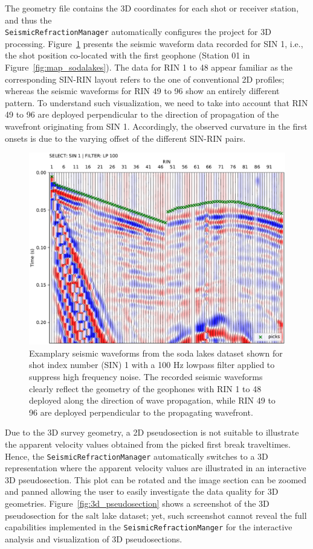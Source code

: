 \documentclass[a4paper,fleqn]{cas-sc}
\begin{document}
The geometry file contains the 3D coordinates for each shot or receiver station, and thus the\\ \texttt{SeismicRefractionManager} 
automatically configures the project for 3D processing. 
Figure~\ref{fig:3d_pickwindow} presents the seismic waveform data recorded for SIN 1, i.e., the shot position co-located with the first geophone (Station 01 in Figure~\ref{fig:map_sodalakes}). The data for RIN 1 to 48 appear familiar as the corresponding SIN-RIN layout refers to the one of conventional 2D profiles; whereas the seismic waveforms for RIN 49 to 96 show an entirely different pattern. To understand such visualization, we need to take into account that RIN 49 to 96 are deployed perpendicular to the direction of propagation of the wavefront originating from SIN 1. Accordingly, the observed curvature in the first onsets is due to the varying offset of the different SIN-RIN pairs.

\begin{figure}
	\centering
	\includegraphics[width=.75\textwidth]{figures/sodalakes_sin1_lp100_picks_vd.pdf}
	\caption{Examplary seismic waveforms from the soda lakes dataset shown for shot index number (SIN) 1 with a 100 Hz lowpass filter applied to suppress high frequency noise. The recorded seismic waveforms clearly reflect the geometry of the geophones with RIN 1 to 48 deployed along the direction of wave propagation, while RIN 49 to 96 are deployed perpendicular to the propagating wavefront.}
	\label{fig:3d_pickwindow}
\end{figure}

Due to the 3D survey geometry, a 2D pseudosection is not suitable 
to illustrate the apparent velocity values obtained from the picked first break traveltimes. Hence, the \texttt{SeismicRefractionManager} automatically switches to a 3D representation where the apparent velocity values are illustrated in an interactive 3D pseudosection. This plot can be rotated and the image section can be zoomed and panned allowing the user to easily investigate the data quality for 3D geometries. Figure~\ref{fig:3d_pseudosection} shows a screenshot of the 3D pseudosection for the salt lake dataset; yet, such screenshot cannot reveal the full capabilities implemented in the \texttt{SeismicRefractionManger} for the interactive analysis and visualization of 3D pseudosections.
\end{document}
